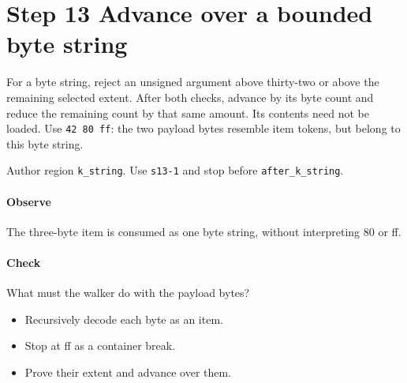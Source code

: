 \section{Step 13 Advance over a bounded byte string}\label{cbor-s13}
For a byte string, reject an unsigned argument above thirty-two or above the remaining selected extent. After both checks, advance by its byte count and reduce the remaining count by that same amount. Its contents need not be loaded. Use \texttt{42 80 ff}: the two payload bytes resemble item tokens, but belong to this byte string.

Author region \texttt{k\_string}. Use \texttt{s13-1} and stop before \texttt{after\_k\_string}.

\paragraph{Observe} The three-byte item is consumed as one byte string, without interpreting 80 or ff.

\paragraph{Check} What must the walker do with the payload bytes?
\begin{itemize}
  \item[A.] Recursively decode each byte as an item.
  \item[B.] Stop at ff as a container break.
  \item[C.] Prove their extent and advance over them.
\end{itemize}
